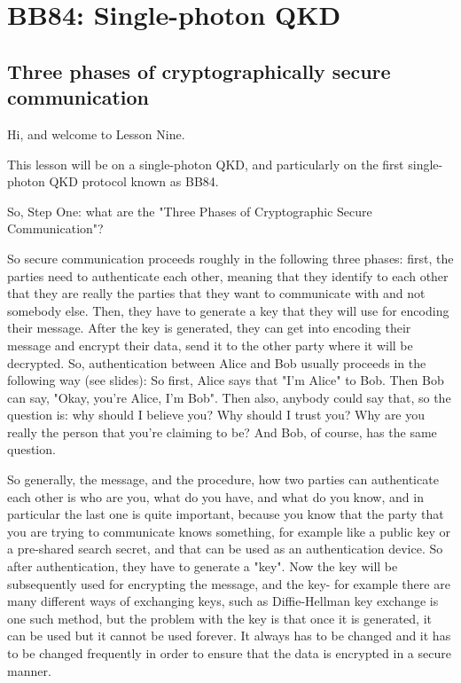 \chapter{BB84: Single-photon QKD}


\section{Three phases of cryptographically secure communication}

Hi, and welcome to Lesson Nine.

This lesson will be on a single-photon QKD, and particularly on the first single-photon QKD protocol known as BB84.

So, Step One: what are the "Three Phases of Cryptographic Secure Communication"?

So secure communication proceeds roughly in the following three phases: first, the parties need to authenticate each other, meaning that they identify to each other that they are really the parties that they want to communicate with and not somebody else. Then, they have to generate a key that they will use for encoding their message. After the key is generated, they can get into encoding their message and encrypt their data, send it to the other party where it will be decrypted. So, authentication between Alice and Bob usually proceeds in the following way (see slides): So first, Alice says that "I'm Alice" to Bob. Then Bob can say, "Okay, you're Alice, I'm Bob". Then also, anybody could say that, so the question is: why should I believe you? Why should I trust you? Why are you really the person that you're claiming to be? And Bob, of course, has the same question.

So generally, the message, and the procedure, how two parties can authenticate each other is who are you, what do you have, and what do you know, and in particular the last one is quite important, because you know that the party that you are trying to communicate knows something, for example like a public key or a pre-shared search secret, and that can be used as an authentication device. So after authentication, they have to generate a "key". Now the key will be subsequently used for encrypting the message, and the key- for example there are many different ways of exchanging keys, such as Diffie-Hellman key exchange is one such method, but the problem with the key is that once it is generated, it can be used but it cannot be used forever. It always has to be changed and it has to be changed frequently in order to ensure that the data is encrypted in a secure manner.

